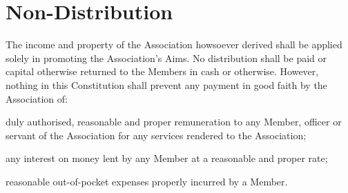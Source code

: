 \documentclass[10pt]{mk-articles-of-association}
\begin{document}


\section{Non-Distribution}

  The income and property of the Association howsoever derived shall be
  applied solely in promoting the Association’s Aims. No distribution shall
  be paid or capital otherwise returned to the Members in cash or otherwise.
  However, nothing in this Constitution shall prevent any payment in good
  faith by the Association of:
  \begin{constenum}
  \item duly authorised, reasonable and proper remuneration to any Member,
    officer or servant of the Association for any services rendered to the
    Association;
  \item any interest on money lent by any Member at a reasonable and proper
    rate; \ITor
  \item reasonable out-of-pocket expenses properly incurred by a Member.
  \end{constenum}



\end{document}
